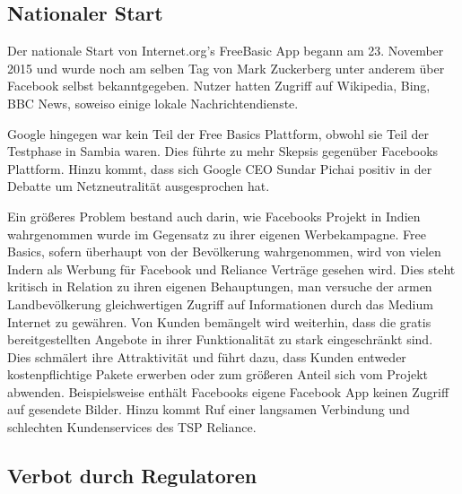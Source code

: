 \documentclass{article}
\begin{document}
\subsection{Nationaler Start}
	Der nationale Start von Internet.org's FreeBasic App begann am 23. November 2015 und wurde noch am selben Tag von Mark Zuckerberg unter anderem über Facebook selbst bekanntgegeben. Nutzer hatten Zugriff auf Wikipedia, Bing, BBC News, soweiso einige lokale Nachrichtendienste.
	
	Google hingegen war kein Teil der Free Basics Plattform, obwohl sie Teil der Testphase in Sambia waren. Dies führte zu mehr Skepsis gegenüber Facebooks Plattform. Hinzu kommt, dass sich Google CEO Sundar Pichai positiv in der Debatte um Netzneutralität ausgesprochen hat.
	
	Ein größeres Problem bestand auch darin, wie Facebooks Projekt in Indien wahrgenommen wurde im Gegensatz zu ihrer eigenen Werbekampagne.
	Free Basics, sofern überhaupt von der Bevölkerung wahrgenommen, wird von vielen Indern als Werbung für Facebook und Reliance Verträge gesehen wird. Dies steht kritisch in Relation zu ihren eigenen Behauptungen, man versuche der armen Landbevölkerung gleichwertigen Zugriff auf Informationen durch das Medium Internet zu gewähren.
	Von Kunden bemängelt wird weiterhin, dass die gratis bereitgestellten Angebote in ihrer Funktionalität zu stark eingeschränkt sind. Dies schmälert ihre Attraktivität und führt dazu, dass Kunden entweder kostenpflichtige Pakete erwerben oder zum größeren Anteil sich vom Projekt abwenden.
	Beispielsweise enthält Facebooks eigene Facebook App keinen Zugriff auf gesendete Bilder. Hinzu kommt Ruf einer langsamen Verbindung und schlechten Kundenservices des TSP Reliance.

\subsection{Verbot durch Regulatoren}
\end{document}
